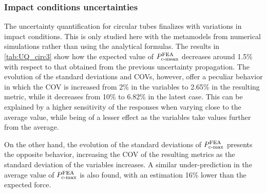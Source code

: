 \documentclass[12pt,number,preprint,review,times]{elsarticle}
\begin{document}
\subsubsection{Impact conditions uncertainties}

The uncertainty quantification for circular tubes finalizes with variations in impact conditions. This is only studied here with the metamodels from numerical simulations rather than using the analytical formulas. The results in \cref{tab:UQ_circ3} show how the expected value of $P^{\mathrm{FEA}}_{\mathrm{c{\text -}mean}}$ decreases around 1.5\% with respect to that obtained from the previous uncertainty propagation. The evolution of the standard deviations and COVs, however, offer a peculiar behavior in which the COV is increased from 2\% in the variables to 2.65\% in the resulting metric, while it decreases from 10\% to 6.82\% in the latest case. This can be explained by a higher sensitivity of the responses when varying close to the average value, while being of a lesser effect as the variables take values further from the average.

On the other hand, the evolution of the standard deviations of $P^{\mathrm{FEA}}_{\mathrm{c{\text -}max}}$ presents the opposite behavior, increasing the COV of the resulting metrics as the standard deviation of the variables increases. A similar under-prediction in the average value of $P^{\mathrm{FEA}}_{\mathrm{c{\text -}max}}$ is also found, with an estimation 16\% lower than the expected force. 

\end{document}
